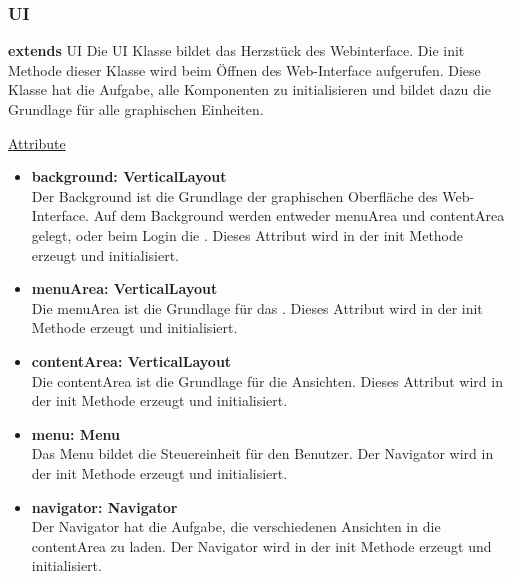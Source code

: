 \subsubsection{UI}\label{UI}
\textbf{extends}  UI \newline
Die UI Klasse bildet das Herzstück des Webinterface. Die init Methode dieser Klasse wird beim Öffnen des Web-Interface aufgerufen. Diese Klasse hat die Aufgabe, alle Komponenten zu initialisieren und bildet dazu die Grundlage für alle graphischen Einheiten.
\newline

\underline{Attribute}
\begin{itemize}
\itemsep0pt

\item \textbf{background: VerticalLayout} \hfill\\ 
Der Background ist die Grundlage der graphischen Oberfläche des Web-Interface. Auf dem Background werden entweder menuArea und contentArea gelegt, oder beim Login die . Dieses Attribut wird in der init Methode erzeugt und initialisiert.

\item \textbf{menuArea: VerticalLayout} \hfill\\ 
Die menuArea ist die Grundlage für das . Dieses Attribut wird in der init Methode erzeugt und initialisiert.

\item \textbf{contentArea: VerticalLayout} \hfill\\ 
Die contentArea ist die Grundlage für die Ansichten. Dieses Attribut wird in der init Methode erzeugt und initialisiert.

\item \textbf{menu: Menu} \hfill\\ 
Das Menu bildet die Steuereinheit für den Benutzer. Der Navigator wird in der init Methode erzeugt und initialisiert.

\item \textbf{navigator: Navigator} \hfill\\ 
Der Navigator hat die Aufgabe, die verschiedenen Ansichten in die contentArea zu laden. Der Navigator wird in der init Methode erzeugt und initialisiert.

\end{itemize}

